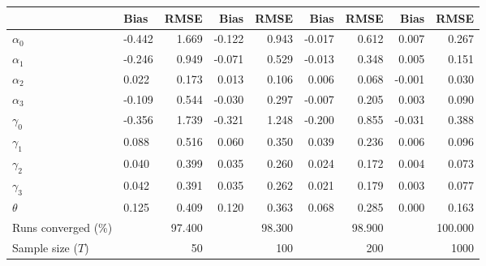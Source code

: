 
\begin{tabular}[t]{llrrrrrrr}
\toprule
  & Bias & RMSE & Bias & RMSE & Bias & RMSE & Bias & RMSE\\
\midrule
$\alpha_{0}$ & -0.442 & 1.669 & -0.122 & 0.943 & -0.017 & 0.612 & 0.007 & 0.267\\
$\alpha_{1}$ & -0.246 & 0.949 & -0.071 & 0.529 & -0.013 & 0.348 & 0.005 & 0.151\\
$\alpha_{2}$ & 0.022 & 0.173 & 0.013 & 0.106 & 0.006 & 0.068 & -0.001 & 0.030\\
$\alpha_{3}$ & -0.109 & 0.544 & -0.030 & 0.297 & -0.007 & 0.205 & 0.003 & 0.090\\
$\gamma_{0}$ & -0.356 & 1.739 & -0.321 & 1.248 & -0.200 & 0.855 & -0.031 & 0.388\\
$\gamma_{1}$ & 0.088 & 0.516 & 0.060 & 0.350 & 0.039 & 0.236 & 0.006 & 0.096\\
$\gamma_{2}$ & 0.040 & 0.399 & 0.035 & 0.260 & 0.024 & 0.172 & 0.004 & 0.073\\
$\gamma_{3}$ & 0.042 & 0.391 & 0.035 & 0.262 & 0.021 & 0.179 & 0.003 & 0.077\\
$\theta$ & 0.125 & 0.409 & 0.120 & 0.363 & 0.068 & 0.285 & 0.000 & 0.163\\
Runs converged (\%) &  & 97.400 &  & 98.300 &  & 98.900 &  & 100.000\\
Sample size ($T$) &  & 50 &  & 100 &  & 200 &  & 1000\\
\bottomrule
\end{tabular}
